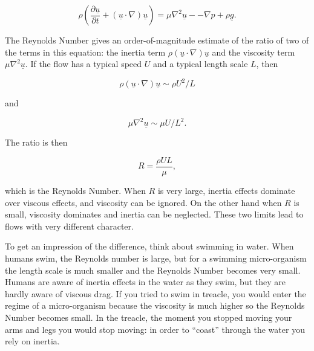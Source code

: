   $$\rho \left(\dfrac{\partial \underline{u}}{\partial t} + (\underline{u} 
  \cdot \nabla) \underline{u} \right) = \mu \nabla^2 \underline{u} -- \nabla p 
  + \rho \underline{g} . \tag{17}$$ 

  The Reynolds Number gives an order-of-magnitude estimate of the ratio of two 
  of the terms in this equation: the inertia term $\rho (\underline{u} \cdot 
  \nabla) \underline{u}$ and the viscosity term $\mu \nabla^2 \underline{u}$. 
  If the flow has a typical speed $U$ and a typical length scale $L$, then 

  $$\rho (\underline{u} \cdot \nabla) \underline{u} \sim \rho U^2 / L 
  \tag{18}$$ 

  and 

  $$\mu \nabla^2 \underline{u} \sim \mu U / L^2. \tag{19}$$ 

  The ratio is then 

  $$R = \dfrac{\rho U L}{\mu}, \tag{20}$$ 

  which is the Reynolds Number. When $R$ is very large, inertia effects 
  dominate over viscous effects, and viscosity can be ignored. On the other 
  hand when $R$ is small, viscosity dominates and inertia can be neglected. 
  These two limits lead to flows with very different character. 

  To get an impression of the difference, think about swimming in water. When 
  humans swim, the Reynolds number is large, but for a swimming micro-organism 
  the length scale is much smaller and the Reynolds Number becomes very small. 
  Humans are aware of inertia effects in the water as they swim, but they are 
  hardly aware of viscous drag. If you tried to swim in treacle, you would 
  enter the regime of a micro-organism because the viscosity is much higher so 
  the Reynolds Number becomes small. In the treacle, the moment you stopped 
  moving your arms and legs you would stop moving: in order to ``coast'' 
  through the water you rely on inertia. 